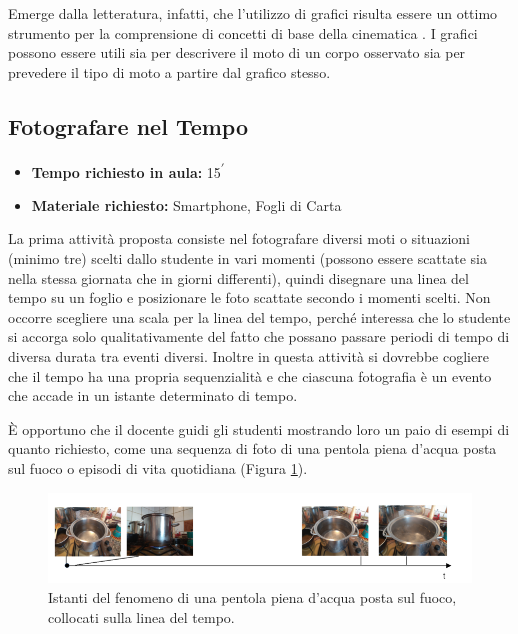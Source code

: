\documentclass{report} \usepackage[T1]{fontenc} \usepackage[italian]{babel}
\begin{document}
Emerge dalla letteratura, infatti, che l’utilizzo di grafici risulta essere un
ottimo strumento per la comprensione di concetti di base della cinematica
\cite{beichner1994testing}. I grafici possono essere
utili sia per descrivere il moto di un corpo osservato sia per prevedere il tipo
di moto a partire dal grafico stesso.

\subsection{Fotografare nel Tempo}

\begin{itemize}
\item \textbf{Tempo richiesto in aula:} 15\textsuperscript{$\prime$}
\item \textbf{Materiale richiesto:} Smartphone, Fogli di Carta
\end{itemize}

La prima attività proposta consiste nel fotografare diversi moti o situazioni
(minimo tre) scelti dallo studente in vari momenti (possono essere scattate sia
nella stessa giornata che in giorni differenti), quindi disegnare una linea del
tempo su un foglio e posizionare le foto scattate secondo i momenti scelti. Non
occorre scegliere una scala per la linea del tempo, perché interessa che lo
studente si accorga solo qualitativamente del fatto che possano passare periodi
di tempo di diversa durata tra eventi diversi. Inoltre in questa attività si
dovrebbe cogliere che il tempo ha una propria sequenzialità e che ciascuna
fotografia è un evento che accade in un istante determinato di tempo.

\`E opportuno che il docente guidi gli studenti mostrando loro un paio di esempi
di quanto richiesto, come una sequenza di foto di una pentola piena d’acqua
posta sul fuoco o episodi di vita quotidiana (Figura \ref{fig:asse_t_pentola}).
\begin{figure}[H]
\centering
  \includegraphics[width=\textwidth]{asse_t_pentola}
  \caption{Istanti del fenomeno di una pentola piena d'acqua posta sul fuoco,
           collocati sulla linea del tempo.}
  \label{fig:asse_t_pentola}
\end{figure}
\end{document}
